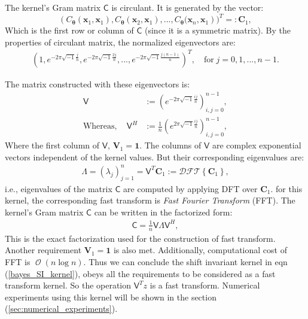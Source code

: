 \documentclass[smallextended]{svjour3}       %
\DeclareMathOperator{\Order}{{\mathcal O}}
\newcommand{\bm}[1]{\boldsymbol{#1}}
\newcommand{\vtheta}{{\bm{\theta}}}
\newcommand{\vC}{\bm{C}}
\newcommand{\vV}{\bm{V}}
\newcommand{\vx}{\bm{x}}
\newcommand{\vCvtheta}{{C_\vtheta}}
\newcommand{\vone}{\bm{1}}
\newcommand{\mC}{\mathsf{C}}
\newcommand{\mLambda}{\mathsf{\Lambda}}
\newcommand{\mV}{\mathsf{V}}
\begin{document}
The kernel's Gram matrix $\mC$ is circulant. It is generated by the vector:
\begin{equation}
\label{eqn_top_row_of_kernel_matrix}
\left( \vCvtheta(\vx_1,\vx_1),\vCvtheta(\vx_2,\vx_1),...,\vCvtheta(\vx_{n},\vx_1 \right) 
)^T =: \vC_1,
\end{equation}
Which is the first row or column of $\mC$ (since it is a symmetric matrix).  By the properties of circulant matrix, the normalized eigenvectors are:
\begin{align*}
\left(
1, 
e^{- 2 \pi \sqrt{-1} \frac{j}{n}},
e^{- 2 \pi \sqrt{-1} \frac{2j}{n}}
,...,
e^{- 2 \pi \sqrt{-1} \frac{j(n-1)}{n}}  
\right)^T, \quad \text{for} \;
j=0,1,...,n-1 .
\end{align*}

The matrix constructed with these eigenvectors is: 
\begin{align*}
\mV  &:= \left(e^{- 2 \pi \sqrt{-1} \frac{i j}{n}} \right)_{i,j=0}^{n-1},
\\
\text{Whereas}, \quad
\mV^H &:= \frac{1}{n} \left(e^{ 2 \pi \sqrt{-1} \frac{i j}{n}} \right)_{i,j=0}^{n-1},
\end{align*}
Where the first column of $\mV$, $\vV_1 = \vone$.
The columns of $\mV$ are complex exponential vectors independent of the kernel values. But their corresponding eigenvalues are:
\begin{align*}
\mLambda = \left( \lambda_j \right)_{j=1}^{n} = \mV^T \vC_1 := \mathcal{DFT} \left\lbrace \vC_1 \right\rbrace,
\end{align*}
i.e., eigenvalues of the matrix $\mC$ are computed by applying DFT over $\vC_1$. 
for this kernel, the corresponding fast transform is \emph{Fast Fourier Transform} (FFT). 
The kernel's Gram matrix $\mC$ can be written in the factorized form:
\begin{align*}
\mC = \frac1n \mV \mLambda \mV^H,
\end{align*}
This is the exact factorization used for the construction of fast transform. 
Another requirement $\vV_1 = \vone$ is also met.
Additionally, computational cost of FFT is $\Order(n \log n)$.
Thus we can conclude the shift invariant kernel in eqn (\ref{bayes_SI_kernel}), obeys all the requirements to be considered as a {fast transform kernel}. So the operation $\mV^T z$ is a fast transform.
Numerical experiments using this kernel will be shown in the section (\ref{sec:numerical_experiments}).
\end{document}
